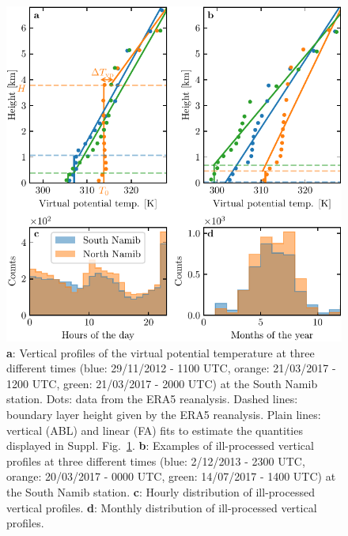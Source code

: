 \begin{figure}[p]
\centering
\includegraphics[scale=1]{Figures/Figure10_supp.pdf}
\caption{\textbf{a}: Vertical profiles of the virtual potential temperature at three different times (blue: 29/11/2012 - 1100 UTC, orange: 21/03/2017 - 1200 UTC, green: 21/03/2017 - 2000 UTC) at the South Namib station. Dots: data from the ERA5 reanalysis. Dashed lines: boundary layer height given by the ERA5 reanalysis. Plain lines: vertical (ABL) and linear (FA) fits to estimate the quantities displayed in Suppl. Fig.~\ref{Fig10_supp}. \textbf{b}: Examples of ill-processed vertical profiles at three different times (blue: 2/12/2013 - 2300 UTC, orange: 20/03/2017 - 0000 UTC, green: 14/07/2017 - 1400 UTC) at the South Namib station. \textbf{c}: Hourly distribution of ill-processed vertical profiles. \textbf{d}: Monthly distribution of ill-processed vertical profiles.}
\label{Fig10_supp}
\end{figure}

